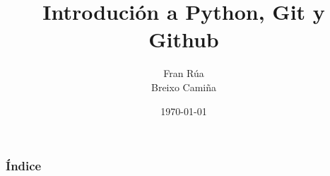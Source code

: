 \documentclass[12pt]{beamer}
\title{Introdución a Python, Git y Github}
\author[Fran Rúa/Breixo Camiña]{Fran Rúa \\ Breixo Camiña}
\institute[GPUL-Labs]{Grupo de Programadores e Usuarios Linux}
\date{\today}
\begin{document}
\begin{frame}
  \titlepage
\end{frame}

\begin{frame}
  \frametitle{Índice}
  \tableofcontents
\end{frame}

\end{document}
